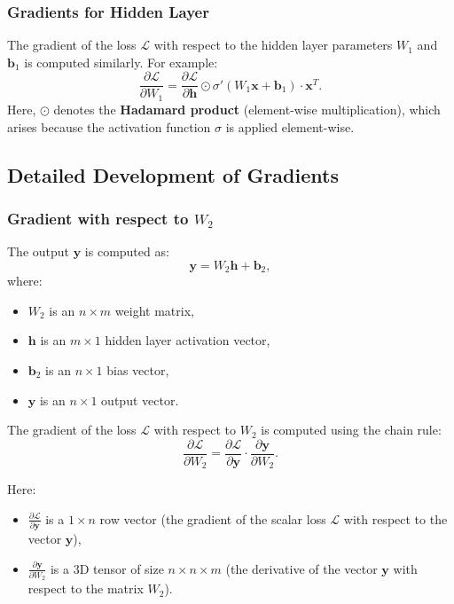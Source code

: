 \begin{notechapter}
\subsubsection{Gradients for Hidden Layer}
The gradient of the loss \( \mathcal{L} \) with respect to the hidden layer parameters \( W_1 \) and \( \mathbf{b}_1 \) is computed similarly. For example:
\[
\frac{\partial \mathcal{L}}{\partial W_1} = \frac{\partial \mathcal{L}}{\partial \mathbf{h}} \odot \sigma'(W_1 \mathbf{x} + \mathbf{b}_1) \cdot \mathbf{x}^T.
\]
Here, \( \odot \) denotes the \textbf{Hadamard product} (element-wise multiplication), which arises because the activation function \( \sigma \) is applied element-wise.

\subsection{Detailed Development of Gradients}

\subsubsection{Gradient with respect to \( W_2 \)}

The output \( \mathbf{y} \) is computed as:
\[
\mathbf{y} = W_2 \mathbf{h} + \mathbf{b}_2,
\]
where:
\begin{itemize}
    \item \( W_2 \) is an \( n \times m \) weight matrix,
    \item \( \mathbf{h} \) is an \( m \times 1 \) hidden layer activation vector,
    \item \( \mathbf{b}_2 \) is an \( n \times 1 \) bias vector,
    \item \( \mathbf{y} \) is an \( n \times 1 \) output vector.
\end{itemize}

The gradient of the loss \( \mathcal{L} \) with respect to \( W_2 \) is computed using the chain rule:
\[
\frac{\partial \mathcal{L}}{\partial W_2} = \frac{\partial \mathcal{L}}{\partial \mathbf{y}} \cdot \frac{\partial \mathbf{y}}{\partial W_2}.
\]

Here:
\begin{itemize}
    \item \( \frac{\partial \mathcal{L}}{\partial \mathbf{y}} \) is a \( 1 \times n \) row vector (the gradient of the scalar loss \( \mathcal{L} \) with respect to the vector \( \mathbf{y} \)),
    \item \( \frac{\partial \mathbf{y}}{\partial W_2} \) is a 3D tensor of size \( n \times n \times m \) (the derivative of the vector \( \mathbf{y} \) with respect to the matrix \( W_2 \)).
\end{itemize}


\end{notechapter}
